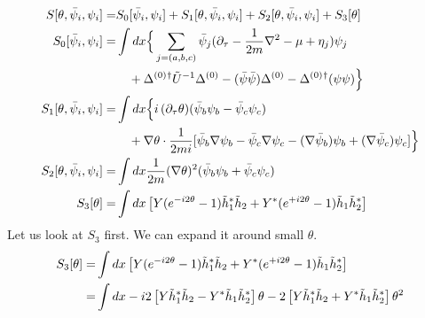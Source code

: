 \begin{subequations}\label{eq:pathInt2:actionPhase2}
\begin{align}
S[\theta,\bar\psi_{i},\psi_{i}]=&S_0[\bar\psi_{i},\psi_{i}]+S_1[\theta,\bar\psi_{i},\psi_{i}]+S_2[\theta,\bar\psi_{i},\psi_{i}]
	+S_3[\theta]\\
S_0[\bar\psi_{i},\psi_{i}]=&\int{dx}
\Big\{\sum_{j=(a,b,c)}\bar\psi_{j}(\partial_\tau-\frac{1}{2m}\nabla^{2}-\mu+\eta_{j})\psi_{j}\nonumber\\
&\quad+\Delta^{(0)}{}^{\dagger}\tilde{U}^{-1}\Delta^{(0)}-(\bar\psi\bar\psi)\Delta^{(0)}-{\Delta^{(0)}}{}^{\dagger}(\psi\psi)\Big\}\\
S_1[\theta,\bar\psi_{i},\psi_{i}]=&\int{dx}\Big\{
   i\,(\partial_{\tau}\theta)(\bar\psi_{b}\psi_{b}-\bar\psi_{c}\psi_{c})\\
   &\quad+\nabla\theta\cdot\frac{1}{2mi}[\bar\psi_{b}\nabla\psi_{b}-\bar\psi_{c}\nabla\psi_{c}
   -(\nabla\bar{\psi}_{b})\psi_{b}   +(\nabla\bar{\psi}_{c})\psi_{c}]\Big\}\\
S_2[\theta,\bar\psi_{i},\psi_{i}]=&\int{dx}\frac{1}{2m}(\nabla\theta)^{2}(\bar\psi_{b}\psi_{b}+\bar\psi_{c}\psi_{c})\\
S_3[\theta]=&\int{dx}\left[Y(e^{-i2\theta}-1)\tilde{h}_{1}^{*}\tilde{h}_{2} +Y^{*}(e^{+i2\theta}-1)\tilde{h}_{1}\tilde{h}_{2}^{*}\right]
\end{align}
\end{subequations}
Let us look at $S_{3}$ first. We can expand it around small $\theta$.  
\begin{align}
S_3[\theta]=&\int{dx}\left[Y(e^{-i2\theta}-1)\tilde{h}_{1}^{*}\tilde{h}_{2} +Y^{*}(e^{+i2\theta}-1)\tilde{h}_{1}\tilde{h}_{2}^{*}\right]\\
  =&\int{dx}-i2\left[Y\tilde{h}_{1}^{*}\tilde{h}_{2} -Y^{*}\tilde{h}_{1}\tilde{h}_{2}^{*}\right]\theta
  	-2\left[Y\tilde{h}_{1}^{*}\tilde{h}_{2} +Y^{*}\tilde{h}_{1}\tilde{h}_{2}^{*}\right]\theta^2
\end{align}



